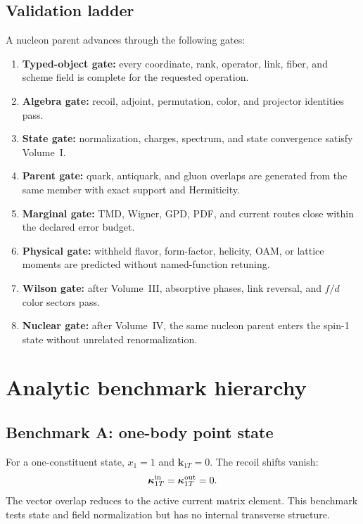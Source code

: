 \documentclass[11pt]{article}
\begin{document}
\subsection{Validation ladder}

A nucleon parent advances through the following gates:
\begin{enumerate}
\item \textbf{Typed-object gate:} every coordinate, rank, operator, link,
      fiber, and scheme field is complete for the requested operation.
\item \textbf{Algebra gate:} recoil, adjoint, permutation, color, and projector
      identities pass.
\item \textbf{State gate:} normalization, charges, spectrum, and state
      convergence satisfy Volume~I.
\item \textbf{Parent gate:} quark, antiquark, and gluon overlaps are generated
      from the same member with exact support and Hermiticity.
\item \textbf{Marginal gate:} TMD, Wigner, GPD, PDF, and current routes close
      within the declared error budget.
\item \textbf{Physical gate:} withheld flavor, form-factor, helicity, OAM, or
      lattice moments are predicted without named-function retuning.
\item \textbf{Wilson gate:} after Volume~III, absorptive phases, link reversal,
      and \(f/d\) color sectors pass.
\item \textbf{Nuclear gate:} after Volume~IV, the same nucleon parent enters
      the spin-1 state without unrelated renormalization.
\end{enumerate}

\section{Analytic benchmark hierarchy}
\label{sec:benchmarks}

\subsection{Benchmark A: one-body point state}

For a one-constituent state, \(x_1=1\) and \(\bm{k}_{1T}=0\).  The recoil shifts
vanish:
\begin{equation}
 \bm\kappa_{1T}^{\rm in}
 =\bm\kappa_{1T}^{\rm out}=0.
\label{eq:one-body-recoil}
\end{equation}
The vector overlap reduces to the active current matrix element.  This
benchmark tests state and field normalization but has no internal transverse
structure.
\end{document}
